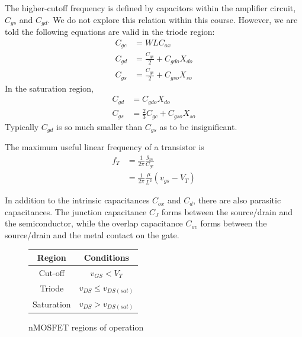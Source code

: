 \documentclass[nobib]{tufte-handout}
\begin{document}
The higher-cutoff frequency is defined by capacitors within 
the amplifier circuit, $C_{gs}$ and $C_{gd}$. 
We do not explore this relation within this course.
However, we are told the following equations are 
valid in the triode region:
\begin{align} \label{eq:35}
    C_{gc} &= WLC_{ox} \\
    C_{gd} &= \frac{C_{gc}}{2} + C_{gdo} X_{do} \\
    C_{gs} &= \frac{C_{gc}}{2} + C_{gso} X_{so}
\end{align}
In the saturation region, 
\begin{align} \label{eq:36}
    C_{gd} &= C_{gdo}X_{do} \\
    C_{gs} &= \frac{2}{3}C_{gc} + C_{gso}X_{so}
\end{align}
Typically $C_{gd}$ is so much smaller than $C_{gs}$
as to be insignificant. 

The maximum useful linear frequency of 
a transistor is
\begin{align} \label{eq:37}
    f_T &= \frac{1}{2\pi} \frac{g_m}{C_{gc}} \\
    &= \frac{1}{2\pi} \frac{\mu}{L^2} (v_{gs} - V_T)
\end{align}

In addition to the intrinsic capacitances $C_{ox}$
and $C_d$, there are also parasitic capacitances. 
The junction capacitance $C_J$ forms between the 
source/drain and the semiconductor, while the 
overlap capacitance $C_{ov}$ forms between the 
source/drain and the metal contact on the gate. 

\newpage

\begin{figure}
    \begin{center}
        \begin{tabular}{ c | c }
            Region & Conditions \\
            \hline
            Cut-off & $v_{GS} < V_T$ \\
            Triode & $v_{DS} \leq v_{DS(sat)}$ \\
            Saturation & $v_{DS} > v_{DS(sat)}$ \\
            \hline
        \end{tabular}
    \end{center}
    \caption{nMOSFET regions of operation}
    \label{tab:nMOSFET regions}
\end{figure}
\end{document}
